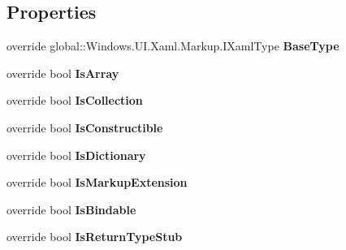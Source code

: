 \subsection*{Properties}
\begin{DoxyCompactItemize}
\item 
\mbox{\label{class_r_f_storage_1_1_r_f_storage___xaml_type_info_1_1_xaml_user_type_a7681477f22eec1c1a354791974a8deb3}} 
override global\+::\+Windows.\+U\+I.\+Xaml.\+Markup.\+I\+Xaml\+Type {\bfseries Base\+Type}\hspace{0.3cm}{\ttfamily  [get]}
\item 
\mbox{\label{class_r_f_storage_1_1_r_f_storage___xaml_type_info_1_1_xaml_user_type_a43bc744a2ad1066135a98e3512e6f229}} 
override bool {\bfseries Is\+Array}\hspace{0.3cm}{\ttfamily  [get]}
\item 
\mbox{\label{class_r_f_storage_1_1_r_f_storage___xaml_type_info_1_1_xaml_user_type_a9357dd264883fd742a290936ad1e0e32}} 
override bool {\bfseries Is\+Collection}\hspace{0.3cm}{\ttfamily  [get]}
\item 
\mbox{\label{class_r_f_storage_1_1_r_f_storage___xaml_type_info_1_1_xaml_user_type_a09ab9eea636e3c2e84b0116910d84772}} 
override bool {\bfseries Is\+Constructible}\hspace{0.3cm}{\ttfamily  [get]}
\item 
\mbox{\label{class_r_f_storage_1_1_r_f_storage___xaml_type_info_1_1_xaml_user_type_a53c6a2956b845179267a4606e003d464}} 
override bool {\bfseries Is\+Dictionary}\hspace{0.3cm}{\ttfamily  [get]}
\item 
\mbox{\label{class_r_f_storage_1_1_r_f_storage___xaml_type_info_1_1_xaml_user_type_ad522b28d8d36b4abff93e07fcb283ff9}} 
override bool {\bfseries Is\+Markup\+Extension}\hspace{0.3cm}{\ttfamily  [get]}
\item 
\mbox{\label{class_r_f_storage_1_1_r_f_storage___xaml_type_info_1_1_xaml_user_type_a7110f9c4d25325b4d5fa610c8f46d359}} 
override bool {\bfseries Is\+Bindable}\hspace{0.3cm}{\ttfamily  [get]}
\item 
\mbox{\label{class_r_f_storage_1_1_r_f_storage___xaml_type_info_1_1_xaml_user_type_ab2bc6ffe93082b4d1f149263e6ecc421}} 
override bool {\bfseries Is\+Return\+Type\+Stub}\hspace{0.3cm}{\ttfamily  [get]}
\item 

\end{DoxyCompactItemize}

